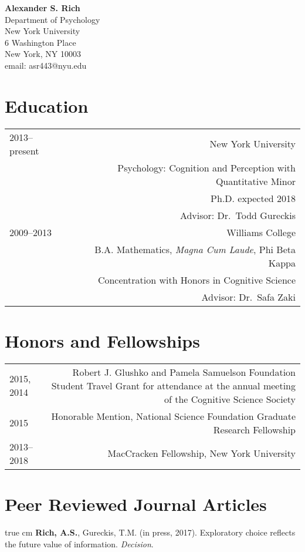\documentclass[12pt]{my_cv}
\def\ind{\hangindent=1 true cm\hangafter=1 \noindent}
\begin{document}
\noindent \textbf{\sffamily\Large Alexander S. Rich}\vspace{1em}\\
Department of Psychology\\
New York University\\
6 Washington Place\\
 New York, NY 10003\\
email: asr443@nyu.edu\\

\section{Education}
\begin{tabular}{L R}
2013--present&New York University\\
&Psychology: Cognition and Perception with Quantitative Minor\\
&Ph.D. expected 2018\\
&Advisor: Dr.\ Todd Gureckis \vspace{1em}\\ 
2009--2013&Williams College\\
&B.A. Mathematics, \emph{Magna Cum Laude}, Phi Beta Kappa\\
&Concentration with Honors in Cognitive Science\\
&Advisor: Dr.\ Safa Zaki\\
\end{tabular}

\section{Honors and Fellowships}
\begin{tabular}{L R}
2015, 2014&Robert J. Glushko and Pamela Samuelson Foundation Student Travel Grant for attendance at the annual meeting of the Cognitive Science Society\\[1ex]
2015&Honorable Mention, National Science Foundation Graduate Research Fellowship\\[1ex]
2013--2018&MacCracken Fellowship, New York University\\
\end{tabular}

\section{Peer Reviewed Journal Articles}

\ind \textbf{Rich, A.S.}, Gureckis, T.M. (in press, 2017). Exploratory choice
reflects the future value of information. \emph{Decision}.
\end{document}
